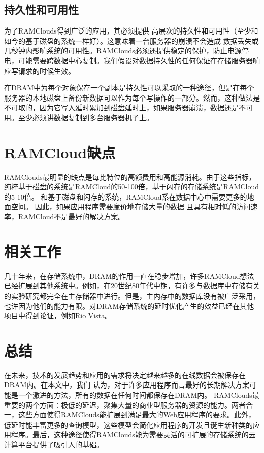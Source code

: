 \documentclass[translation]{zjutreport}
\begin{document}
\section{持久性和可用性}
为了RAMClouds得到广泛的应用，其必须提供
高层次的持久性和可用性（至少和如今的基于磁盘的系统一样好）。这意味着一台服务器的崩溃不会造成
数据丢失或几秒钟内影响系统的可用性。RAMClouds必须还提供稳定的保护，防止电源停电，可能需要跨数据中心复制。我们假设对数据持久性的任何保证在存储服务器响应写请求的时候生效。

在DRAM中为每个对象保存一个副本是持久性可以采取的一种途径，但是在每个服务器的本地磁盘上备份新数据可以作为每个写操作的一部分。然而，这种做法是不可取的，因为它写入延时累加到磁盘延时上，如果服务器崩溃，数据还是不可用。至少必须讲数据复制到多台服务器机子上。

\chapter{RAMCloud缺点}
RAMClouds最明显的缺点是每比特位的高额费用和高能源消耗。由于这些指标，纯粹基于磁盘的系统是RAMCloud的50-100倍，基于闪存的存储系统是RAMCloud的5-10倍。
和基于磁盘和闪存的系统，RAMCloud系在数据中心中需要更多的地面空间。
因此，如果应用程序需要廉价地存储大量的数据
且具有相对低的访问速率，RAMCloud不是最好的解决方案。

\chapter{相关工作}
几十年来，在存储系统中，DRAM的作用一直在稳步增加，许多RAMCloud想法已经扩展到其他系统中。例如，在20世纪80年代中期，有许多与数据库中存储有关的实验研究都完全在主存储器中进行。但是，主内存中的数据库没有被广泛采用，也许因为他们的能力有限。对DRAM存储系统的延时优化产生的效益已经在其他项目中得到论证，例如Rio Vista。

\chapter{总结}
在未来，技术的发展趋势和应用的需求将决定越来越多的在线数据会被保存在DRAM内。在本文中，我们
认为，对于许多应用程序而言最好的长期​​解决方案可能是一个激进的方法，所有的数据在任何时间都保存在DRAM内。
RAMClouds最重要的两个方面：极低的延迟，聚集大量的商业型服务器的资源的能力。两者合一，这些方面使得RAMClouds能扩展到满足最大的Web应用程序的要求。此外，低延时能丰富更多的查询模型，这些模型会简化应用程序的开发且诞生新种类的应用程序。最后，这种途径使得RAMClouds能为需要灵活的可扩展的存储系统的云计算平台提供了吸引人的基础。

\backmatter %
\endgroup %

\clearpage %

\nocite{*}                                   %


\end{document}
